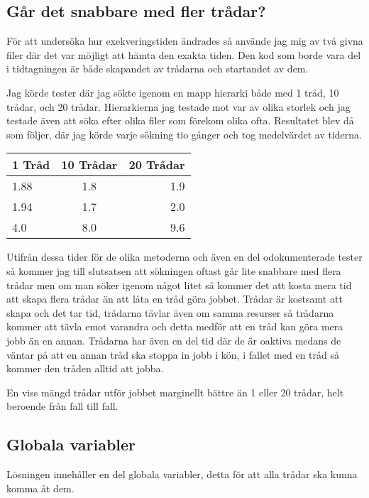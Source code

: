 \documentclass[11pt, titlepage, oneside, a4paper]{article}
\newcommand{\Subsection}[1]{\vspace{-4pt}\subsection{#1}\vspace{-8pt}}
\begin{document}
						
		\Subsection{Går det snabbare med fler trådar?}
		  För att undersöka hur exekveringstiden ändrades så använde jag mig av två givna filer där det var möjligt att hämta den exakta tiden.
		  Den kod som borde vara del i tidtagningen är både skapandet av trådarna och startandet av dem.
		  
		  Jag körde tester där jag sökte igenom en mapp hierarki både med 1 tråd, 10 trådar, och 20 trådar. Hierarkierna jag testade mot var av olika storlek 
		  och jag testade även att söka efter olika filer som förekom olika ofta. Resultatet blev då som följer, där jag körde varje sökning tio gånger och tog medelvärdet av tiderna.
		
		  \begin{tabular}{| l | c | r | }
		  \hline
		  1 Tråd & 10 Trådar & 20 Trådar \\ \hline
		  1.88 & 1.8 & 1.9 \\ \hline
		  1.94 & 1.7 & 2.0 \\ \hline
		  4.0 & 8.0 & 9.6 \\ \hline
		  \end{tabular}
		  
		  Utifrån dessa tider för de olika metoderna och även en del odokumenterade tester så kommer jag till slutsatsen att sökningen oftast går lite snabbare med flera trådar
		  men om man söker igenom något litet så kommer det att kosta mera tid att skapa flera trådar än att låta en tråd göra jobbet. Trådar är kostsamt att skapa
		  och det tar tid, trådarna tävlar även om samma resurser så trådarna kommer att tävla emot varandra och detta medför att en tråd kan göra mera jobb än en annan.
		  Trådarna har även en del tid där de är oaktiva medans de väntar på att en annan tråd ska stoppa in jobb i kön, i fallet med en tråd så kommer den 
		  tråden alltid att jobba.
		  
		  En viss mängd trådar utför jobbet marginellt bättre än 1 eller 20 trådar, helt beroende från fall till fall.
		
		
		 \Subsection{Globala variabler}
		    Lösningen innehåller en del globala variabler, detta för att alla trådar ska kunna komma åt dem.
		    
\end{document}
